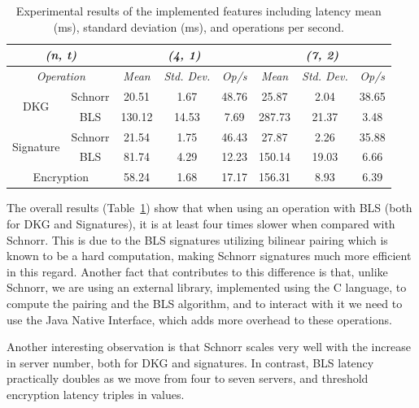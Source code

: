 \documentclass[runningheads]{llncs}
\begin{document}
\setlength{\tabcolsep}{6pt}
\renewcommand{\arraystretch}{1.25}
\begin{table}[]
\caption{Experimental results of the implemented features including latency mean (ms), standard deviation (ms), and operations per second.}
\label{tb:results}
\centering
\begin{tabular}{|cc|ccc|ccc|}
\hline
\multicolumn{2}{|c|}{\textit{(n, t)}} & \multicolumn{3}{c|}{\textit{(4, 1)}} & \multicolumn{3}{c|}{\textit{(7, 2)}} \\ \hline
\multicolumn{2}{|c|}{\textit{Operation}} & \multicolumn{1}{c|}{\textit{Mean}} & \multicolumn{1}{c|}{\textit{Std. Dev.}} & \textit{Op/s} & \multicolumn{1}{c|}{\textit{Mean}} & \multicolumn{1}{c|}{\textit{Std. Dev.}} & \textit{Op/s} \\ [0.5ex] \hline \hline
\multicolumn{1}{|c|}{\multirow{2}{*}{DKG}} & Schnorr & 20.51 & 1.67 & 48.76 & 25.87 & 2.04 & 38.65 \\ \cline{2-2}
\multicolumn{1}{|c|}{} & BLS & 130.12 & 14.53 & 7.69 & 287.73 & 21.37 & 3.48 \\ \hline
\multicolumn{1}{|c|}{\multirow{2}{*}{Signature}} & Schnorr & 21.54 & 1.75 & 46.43 & 27.87 & 2.26 & 35.88 \\ \cline{2-2}
\multicolumn{1}{|c|}{} & BLS & 81.74 & 4.29 & 12.23 & 150.14 & 19.03 & 6.66 \\ \hline
\multicolumn{2}{|c|}{Encryption} & 58.24 & 1.68 & 17.17 & 156.31 & 8.93 & 6.39 \\ \hline
\end{tabular}
\end{table}
The overall results (Table~\ref{tb:results}) show that when using an operation with BLS (both for DKG and Signatures), it is at least four times slower when compared with Schnorr. This is due to the BLS signatures utilizing bilinear pairing which is known to be a hard computation, making Schnorr signatures much more efficient in this regard. Another fact that contributes to this difference is that, unlike Schnorr, we are using an external library, implemented using the C language, to compute the pairing and the BLS algorithm, and to interact with it we need to use the Java Native Interface, which adds more overhead to these operations.

Another interesting observation is that Schnorr scales very well with the increase in server number, both for DKG and signatures. In contrast, BLS latency practically doubles as we move from four to seven servers, and threshold encryption latency triples in values.
\end{document}
